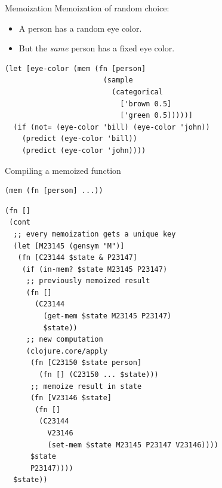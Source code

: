 \documentclass{beamer}
\begin{document}
\begin{frame}[fragile]{Memoization}
Memoization of random choice:
\begin{itemize}
    \item A person has a random eye color.
    \item But the \textit{same} person has a fixed eye color.
\end{itemize}
\begin{verbatim}
(let [eye-color (mem (fn [person] 
                       (sample 
                         (categorical
                           ['brown 0.5]
                           ['green 0.5]))))]
  (if (not= (eye-color 'bill) (eye-color 'john))
    (predict (eye-color 'bill))
    (predict (eye-color 'john))))
\end{verbatim}
\end{frame}

\begin{frame}[fragile]{Compiling a memoized function}
    \vspace{-2em}
    \begin{minipage}{0.38\textwidth}
\begin{verbatim}
(mem (fn [person] ...))
\end{verbatim}
    \end{minipage}
    \begin{minipage}{0.52\textwidth}
    \vspace{2em}
\begin{verbatim}
(fn []
 (cont
  ;; every memoization gets a unique key  
  (let [M23145 (gensym "M")]
   (fn [C23144 $state & P23147]
    (if (in-mem? $state M23145 P23147)
     ;; previously memoized result
     (fn []
       (C23144
         (get-mem $state M23145 P23147)
         $state))
     ;; new computation
     (clojure.core/apply
      (fn [C23150 $state person]
        (fn [] (C23150 ... $state)))
      ;; memoize result in state
      (fn [V23146 $state]
       (fn []
        (C23144
          V23146
          (set-mem $state M23145 P23147 V23146))))
      $state
      P23147))))
  $state))
\end{verbatim}
    \end{minipage}
\end{frame}
\end{document}

